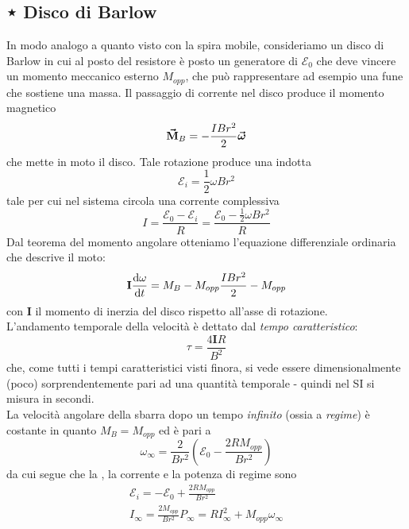 \subsection{⋆ Disco di Barlow}
In modo analogo a quanto visto con la spira mobile, consideriamo un disco di Barlow in cui al posto del resistore è posto un generatore di \fem $\mathcal{E}_0$ che deve vincere un momento meccanico esterno $M_{opp}$, che può rappresentare ad esempio una fune che sostiene una massa. Il passaggio di corrente nel disco produce il momento magnetico
\begin{equation*}
	\vb*{\va{M}}_B=-\frac{IBr^2}{2}\vb*{\va{\omega}}
\end{equation*}
che mette in moto il disco. Tale rotazione produce una \fem indotta
\begin{equation*}
	\mathcal{E}_i=\frac{1}{2}\omega Br^2
\end{equation*}
tale per cui nel sistema circola una corrente complessiva
\begin{equation*}
	I=\frac{\mathcal{E}_0-\mathcal{E}_i}{R}=\frac{\mathcal{E}_0-\frac{1}{2}\omega Br^2}{R}
\end{equation*}
Dal teorema del momento angolare otteniamo l'equazione differenziale ordinaria che descrive il moto:
\begin{equation*}
	\mathbf{I}\dv{\omega}{t}=M_B-M_{opp}\frac{IBr^2}{2}-M_{opp}
\end{equation*}
con $\mathbf{I}$ il momento di inerzia del disco rispetto all'asse di rotazione.\\
L'andamento temporale della velocità è dettato dal \textit{tempo caratteristico}:
\begin{equation}
	\tau=\frac{4\mathbf{I}R}{B^2}
\end{equation}
che, come tutti i tempi caratteristici visti finora, si vede essere dimensionalmente (poco) sorprendentemente pari ad una quantità temporale - quindi nel SI si misura in secondi.\\
La velocità angolare della sbarra dopo un tempo \textit{infinito} (ossia a \textit{regime}) è costante in quanto $M_B=M_{opp}$ ed è pari a
\begin{equation}
	\omega_{\infty}=\frac{2}{Br^2}\left(\mathcal{E}_0-\frac{2RM_{opp}}{Br^2}\right)
\end{equation}
da cui segue che la \fem, la corrente e la potenza di regime sono
\begin{gather}
	\mathcal{E}_i=-\mathcal{E}_0+\frac{2R M_{opp}}{Br^2}\\
	I_{\infty}=\frac{2M_{opp}}{Br^2}
	P_{\infty}=RI_{\infty}^2+M_{opp}\omega_{\infty}
\end{gather}
